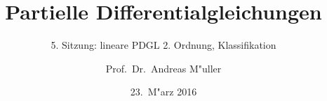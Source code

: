 \documentclass[handout]{beamer}
\title[]{Partielle Differentialgleichungen}
\subtitle{5. Sitzung: lineare PDGL 2. Ordnung, Klassifikation}
\date[23.~M"arz 2016]{23.~M"arz 2016}
\author{Prof.~Dr.~Andreas M"uller}
\begin{document}
\begin{frame}
\titlepage

\end{frame}


\end{document}
